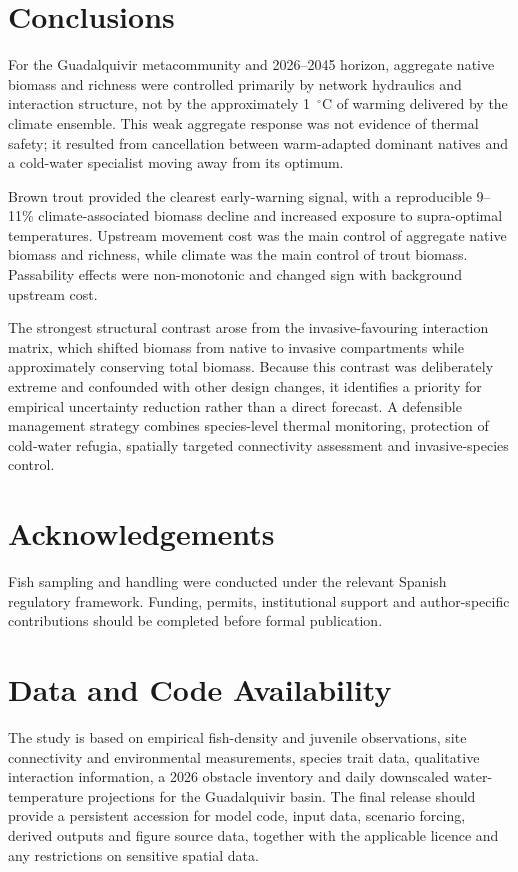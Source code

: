 \documentclass[11pt,a4paper]{article}
\begin{document}
\section{Conclusions}

For the Guadalquivir metacommunity and 2026--2045 horizon, aggregate native biomass and richness were controlled primarily by network hydraulics and interaction structure, not by the approximately 1~$^\circ$C of warming delivered by the climate ensemble. This weak aggregate response was not evidence of thermal safety; it resulted from cancellation between warm-adapted dominant natives and a cold-water specialist moving away from its optimum.

Brown trout provided the clearest early-warning signal, with a reproducible 9--11\% climate-associated biomass decline and increased exposure to supra-optimal temperatures. Upstream movement cost was the main control of aggregate native biomass and richness, while climate was the main control of trout biomass. Passability effects were non-monotonic and changed sign with background upstream cost.

The strongest structural contrast arose from the invasive-favouring interaction matrix, which shifted biomass from native to invasive compartments while approximately conserving total biomass. Because this contrast was deliberately extreme and confounded with other design changes, it identifies a priority for empirical uncertainty reduction rather than a direct forecast. A defensible management strategy combines species-level thermal monitoring, protection of cold-water refugia, spatially targeted connectivity assessment and invasive-species control.

\section{Acknowledgements}

Fish sampling and handling were conducted under the relevant Spanish regulatory framework. Funding, permits, institutional support and author-specific contributions should be completed before formal publication.

\section{Data and Code Availability}

The study is based on empirical fish-density and juvenile observations, site connectivity and environmental measurements, species trait data, qualitative interaction information, a 2026 obstacle inventory and daily downscaled water-temperature projections for the Guadalquivir basin. The final release should provide a persistent accession for model code, input data, scenario forcing, derived outputs and figure source data, together with the applicable licence and any restrictions on sensitive spatial data.
\end{document}
